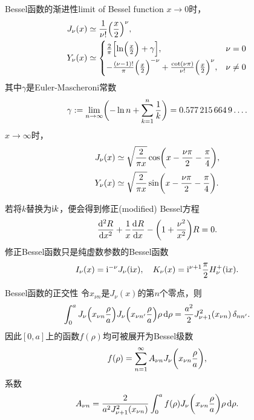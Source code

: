 \begin{example}{Bessel函数的渐进性}{limit of Bessel function}
    $x\to 0$时， 
    \begin{align*}
        J_\nu(x)&\simeq\frac1{\nu!}\Bigkh{\frac x2}^\nu,\quad\\
        Y_\nu(x)&\simeq
        \begin{cases}
            \frac2\pi\Bigfkh{\ln\Bigkh{\frac x2}+\gamma},&\nu=0\\[1ex]
            -\frac{(\nu-1)!}\pi\Bigkh{\frac x2}^{-\nu}+\frac{\cot(\nu\pi)}{\nu!}\Bigkh{\frac x2}^\nu,&\nu\neq 0
        \end{cases}
    \end{align*}
    其中$\gamma$是Euler-Mascheroni常数
    \[
        \gamma:=\lim_{n\to\infty}\biggkh{-\ln n+\sum_{k=1}^n\frac1k}=\num{0.5772156649}\ldots.
    \]
    \tcblower
    $x\to\infty$时， 
    \begin{align*}
        J_\nu(x)&\simeq\sqrt{\frac2{\pi x}}\cos\biggkh{x-\frac{\nu\pi}2-\frac\pi{4}},\\
        Y_\nu(x)&\simeq\sqrt{\frac2{\pi x}}\sin\biggkh{x-\frac{\nu\pi}2-\frac\pi{4}}.
    \end{align*}
\end{example}
若将$k$替换为$\i k$，便会得到修正(modified) Bessel方程
\[
    \dv[2]Rx+\frac1x\dv Rx-\biggkh{1+\frac{\nu^2}{x^2}}R=0.
\]
修正Bessel函数只是纯虚数参数的Bessel函数
\[
    I_\nu(x)=\i^{-\nu}J_\nu(\i x),\quad K_\nu(x)=\i^{\nu+1}\frac\pi 2H_\nu^+(\i x).
\]
\begin{theorem}{Bessel函数的正交性}{}
    令$x_{\nu n}$是$J_\nu(x)$的第$n$个零点，则
    \begin{equation}
        \int_0^a J_\nu\Bigkh{x_{\nu n}\frac\rho a}J_\nu\Bigkh{x_{\nu n'}\frac\rho a}\rho\d\rho=\frac{a^2}2J_{\nu+1}^2(x_{\nu n})\vd_{nn'}.
    \end{equation}
    因此$[0,a]$上的函数$f(\rho)$均可被展开为Bessel级数
    \[
        f(\rho)=\sum_{n=1}^\infty A_{\nu n}J_\nu\biggkh{x_{\nu n}\frac\rho a},
    \]
    系数 
    \[
        A_{\nu n}=\frac2{a^2J_{\nu+1}^2(x_{\nu n})}\int_0^af(\rho)J_\nu\biggkh{x_{\nu n}\frac\rho a}\rho\d\rho.
    \]
\end{theorem}


